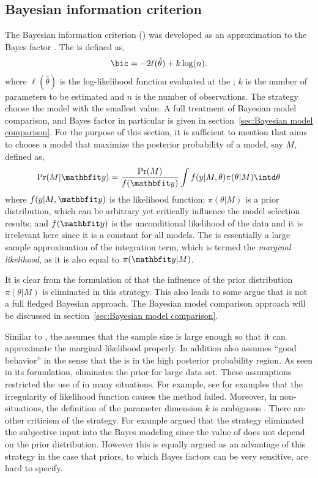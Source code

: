 \subsection{Bayesian information criterion}
\label{sub:Bayesian information criterion}

The Bayesian information criterion (\bic) was developed as an approximation to
the Bayes factor \cite{Schwarz:1978uv}. The \bic is defined as,
\begin{equation}
  \text{\bic} = -2\ell(\hat\theta) + k\log(n).
  \label{eq:bic}
\end{equation}
where $\ell(\hat\theta)$ is the log-likelihood function evaluated at the
\mle; $k$ is the number of parameters to be estimated and $n$ is the number of
observations. The \bic strategy choose the model with the smallest \bic value.
A full treatment of Bayesian model comparison, and Bayes factor in particular
is given in section~\ref{sec:Bayesian model comparison}. For the purpose of
this section, it is sufficient to mention that \bic aims to choose a model
that maximize the posterior probability of a model, say $M$, defined as,
\begin{equation}
  \Pr(M|\data) = \frac{\Pr(M)}{f(\data)}\int
  f(y|M,\theta)\pi(\theta|M)\intd\theta
\end{equation}
where $f(y|M,\data)$ is the likelihood function; $\pi(\theta|M)$ is a prior
distribution, which can be arbitrary yet critically influence the model
selection results; and $f(\data)$ is the unconditional likelihood of the data
and it is irrelevant here since it is a constant for all models. The \bic is
essentially a large sample approximation of the integration term, which is
termed the \emph{marginal likelihood}, as it is also equal to $\pi(\data|M)$.

It is clear from the formulation of \bic that the influence of the prior
distribution $\pi(\theta|M)$ is eliminated in this strategy. This also leads
to some argue that \bic is not a full fledged Bayesian approach. The Bayesian
model comparison approach will be discussed in section~\ref{sec:Bayesian model
  comparison}.

Similar to \aic, the \bic assumes that the sample size is large enough so that
it can approximate the marginal likelihood properly. In addition \bic also
assumes ``good behavior'' in the sense that the \mle is in the high posterior
probability region. As seen in its formulation, \bic eliminates the prior for
large data set. These assumptions restricted the use of \bic in many
situations. For example, see \cite{Berger:2001uy} for examples that the
irregularity of likelihood function causes the \bic method failed. Moreover,
in non-\iid situations, the definition of the parameter dimension $k$ is
ambiguous \cite{Spiegelhalter:1998uc, Kass:1995vb}. There are other criticism
of the \bic strategy. For example \cite[][sec.~7.2.3]{Robert:2007tc} argued
that the \bic strategy eliminated the subjective input into the Bayes modeling
since the value of \bic does not depend on the prior distribution. However
this is equally argued as an advantage of this strategy in the case that
priors, to which Bayes factors can be very sensitive, are hard to specify.

